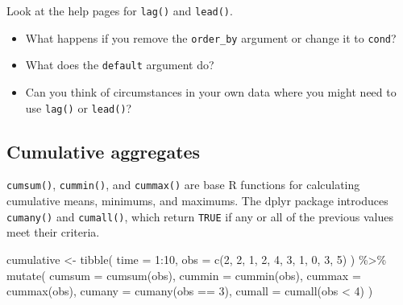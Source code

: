 \documentclass[
  oneside]{book}
\newenvironment{Shaded}{\begin{snugshade}}{\end{snugshade}}
\newcommand{\AttributeTok}[1]{\textcolor[rgb]{0.77,0.63,0.00}{#1}}
\newcommand{\DecValTok}[1]{\textcolor[rgb]{0.00,0.00,0.81}{#1}}
\newcommand{\FunctionTok}[1]{\textcolor[rgb]{0.00,0.00,0.00}{#1}}
\newcommand{\NormalTok}[1]{#1}
\newcommand{\OtherTok}[1]{\textcolor[rgb]{0.56,0.35,0.01}{#1}}
\newcommand{\SpecialCharTok}[1]{\textcolor[rgb]{0.00,0.00,0.00}{#1}}
\providecommand{\tightlist}{%
  \setlength{\itemsep}{0pt}\setlength{\parskip}{0pt}}
\begin{document}
\begin{try}

Look at the help pages for \texttt{lag()} and \texttt{lead()}.

\begin{itemize}
\tightlist
\item
  What happens if you remove the \texttt{order\_by} argument or change it to \texttt{cond}?
\item
  What does the \texttt{default} argument do?
\item
  Can you think of circumstances in your own data where you might need to use \texttt{lag()} or \texttt{lead()}?
\end{itemize}

\end{try}

\hypertarget{cumulative-aggregates}{%
\subsection{Cumulative aggregates}\label{cumulative-aggregates}}

\texttt{cumsum()}, \texttt{cummin()}, and \texttt{cummax()} are base R functions for calculating cumulative means, minimums, and maximums. The dplyr package introduces \texttt{cumany()} and \texttt{cumall()}, which return \texttt{TRUE} if any or all of the previous values meet their criteria.

\begin{Shaded}
\begin{Highlighting}[]
\NormalTok{cumulative }\OtherTok{\textless{}{-}} \FunctionTok{tibble}\NormalTok{(}
  \AttributeTok{time =} \DecValTok{1}\SpecialCharTok{:}\DecValTok{10}\NormalTok{,}
  \AttributeTok{obs =} \FunctionTok{c}\NormalTok{(}\DecValTok{2}\NormalTok{, }\DecValTok{2}\NormalTok{, }\DecValTok{1}\NormalTok{, }\DecValTok{2}\NormalTok{, }\DecValTok{4}\NormalTok{, }\DecValTok{3}\NormalTok{, }\DecValTok{1}\NormalTok{, }\DecValTok{0}\NormalTok{, }\DecValTok{3}\NormalTok{, }\DecValTok{5}\NormalTok{)}
\NormalTok{) }\SpecialCharTok{\%\textgreater{}\%}
  \FunctionTok{mutate}\NormalTok{(}
    \AttributeTok{cumsum =} \FunctionTok{cumsum}\NormalTok{(obs),}
    \AttributeTok{cummin =} \FunctionTok{cummin}\NormalTok{(obs),}
    \AttributeTok{cummax =} \FunctionTok{cummax}\NormalTok{(obs),}
    \AttributeTok{cumany =} \FunctionTok{cumany}\NormalTok{(obs }\SpecialCharTok{==} \DecValTok{3}\NormalTok{),}
    \AttributeTok{cumall =} \FunctionTok{cumall}\NormalTok{(obs }\SpecialCharTok{\textless{}} \DecValTok{4}\NormalTok{)}
\NormalTok{  )}
\end{Highlighting}
\end{Shaded}
\end{document}
